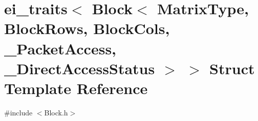 \hypertarget{structei__traits_3_01_block_3_01_matrix_type_00_01_block_rows_00_01_block_cols_00_01___packet_ac479d6b4c208794fdc7c9c0ab098ad674}{\section{ei\-\_\-traits$<$ Block$<$ Matrix\-Type, Block\-Rows, Block\-Cols, \-\_\-\-Packet\-Access, \-\_\-\-Direct\-Access\-Status $>$ $>$ Struct Template Reference}
\label{structei__traits_3_01_block_3_01_matrix_type_00_01_block_rows_00_01_block_cols_00_01___packet_ac479d6b4c208794fdc7c9c0ab098ad674}
}


{\ttfamily \#include $<$Block.\-h$>$}

